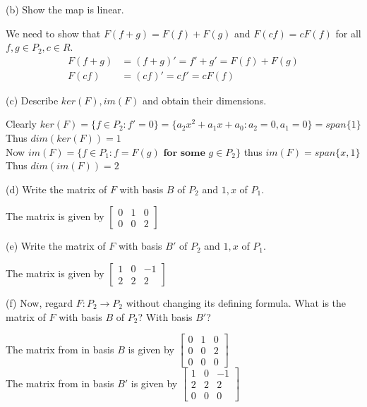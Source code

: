 \documentclass[answers,12pt,addpoints]{exam}
\begin{document}
(b) Show the map is linear.
\begin{solution}
    We need to show that $F(f + g) = F(f) + F(g)$ and $F(cf) = cF(f)$ for all $f,g\in P_2,c\in R$.\\
    \begin{align*}
        F(f + g) &= (f + g)' = f' + g' = F(f) + F(g) \\
        F(cf) &= (cf)' = cf' = cF(f)
    \end{align*}
\end{solution}

(c) Describe $ker(F),im(F)$ and obtain their dimensions.
\begin{solution}
    Clearly $ker(F)=\{f\in P_2:f'=0\}=\{a_2x^2+a_1x+a_0:a_2=0,a_1=0\} = span\{1\}$\\
    Thus $dim(ker(F))=1$\\
    Now $im(F)=\{f\in P_1: f= F(g) \textbf{ for some } g \in P_2\}$ thus $im(F)=span\{x, 1\}$
    Thus $dim(im(F))=2$
\end{solution}

(d) Write the matrix of $F$ with basis $B$ of $P_2$ and $1,x$ of $P_1$.
\begin{solution}
    The matrix is given by 
    $\begin{bmatrix} 
        0 & 1 & 0 \\
        0 & 0 & 2
    \end{bmatrix}$
\end{solution}

(e) Write the matrix of $F$ with basis $B'$ of $P_2$ and $1,x$ of $P_1$.
\begin{solution}
    The matrix is given by 
    $\begin{bmatrix} 
        1 & 0 & -1 \\
        2 & 2 & 2
    \end{bmatrix}$
\end{solution}

(f) Now, regard $F:P_2\to P_2$ without changing its defining formula. What is the matrix of $F$ with basis $B$ of $P_2$? With basis $B'$?
\begin{solution}
    The matrix from in basis $B$ is given by 
    $\begin{bmatrix} 
        0 & 1 & 0 \\
        0 & 0 & 2\\
        0 & 0 & 0
    \end{bmatrix}$\\
    The matrix from in basis $B'$ is given by
    $\begin{bmatrix} 
        1 & 0 & -1 \\
        2 & 2 & 2\\
        0 & 0 & 0
    \end{bmatrix}$
\end{solution}
\end{document}
